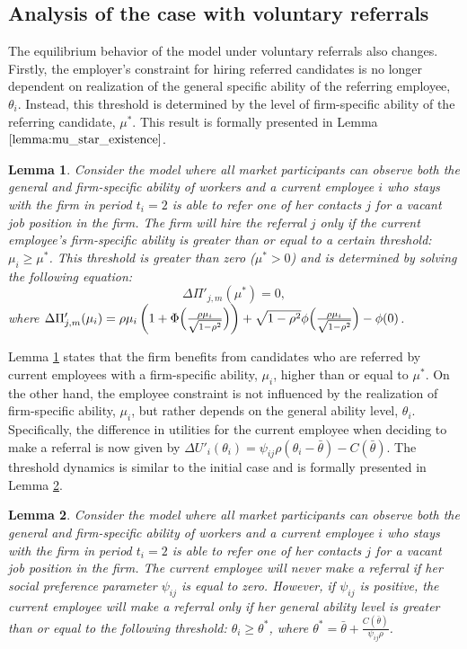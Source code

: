 \documentclass[12pt]{article}
\newtheorem{lemma}{Lemma}
\begin{document}
\subsection{Analysis of the case with voluntary referrals}

The equilibrium behavior of the model under voluntary referrals also changes. Firstly, the employer's constraint for hiring referred candidates is no longer dependent on realization of the general specific ability of the referring employee, $\theta_i$. Instead, this threshold is determined by the level of firm-specific ability of the referring candidate, $\mu^*$. This result is formally presented in Lemma $\ref{lemma:mu_star_existence}$.
\begin{lemma}\label{lemma:mu_star_existence}
    Consider the model where all market participants can observe both the general and firm-specific ability of workers and a current employee $i$ who stays with the firm in period $t_i = 2$ is able to refer one of her contacts $j$ for a vacant job position in the firm. The firm will hire the referral $j$ only if the current employee's firm-specific ability is greater than or equal to a certain threshold: $\mu_i \geq \mu^*$. This threshold is greater than zero ($\mu^* > 0$) and is determined by solving the following equation:
    \begin{equation}
        \Delta\Pi'_{j,m}(\mu^*) = 0,
    \end{equation}
    where $\Delta\Pi'_{j,m}(\mu_i) = \rho\mu_i\left(1 + \Phi\Bigl( \frac{\rho\mu_i}{\sqrt{1-\rho^2}} \Bigr) \right) + \sqrt{1-\rho^2}\phi \Bigl( \frac{\rho\mu_i}{\sqrt{1-\rho^2}} \Bigr) - \phi(0)$.
\end{lemma}

Lemma \ref{lemma:mu_star_existence} states that the firm benefits from candidates who are referred by current employees with a firm-specific ability, $\mu_i$, higher than or equal to $\mu^*$. On the other hand, the employee constraint is not influenced by the realization of firm-specific ability, $\mu_i$, but rather depends on the general ability level, $\theta_i$. Specifically, the difference in utilities for the current employee when deciding to make a referral is now given by $\Delta U'_{i}(\theta_i) = \psi_{ij}\rho(\theta_i-\bar{\theta})- C(\bar{\theta})$. The threshold dynamics is similar to the initial case and is formally presented in Lemma \ref{lemma:theta_star_existence}.
\begin{lemma}\label{lemma:theta_star_existence}
    Consider the model where all market participants can observe both the general and firm-specific ability of workers and a current employee $i$ who stays with the firm in period $t_i = 2$ is able to refer one of her contacts $j$ for a vacant job position in the firm.  The current employee will never make a referral if her social preference parameter $\psi_{ij}$ is equal to zero. However, if $\psi_{ij}$ is positive, the current employee will make a referral only if her general ability level is greater than or equal to the following threshold: $\theta_i \geq \theta^*$, where $\theta^* = \bar{\theta}+\frac{C(\bar{\theta})}{\psi_{ij}\rho}$.
\end{lemma}
\end{document}
